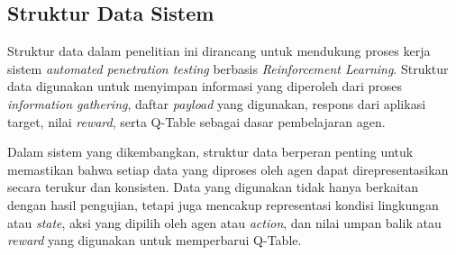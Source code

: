 \subsection{Struktur Data Sistem}

Struktur data dalam penelitian ini dirancang untuk mendukung proses kerja sistem \textit{automated penetration testing} berbasis \textit{Reinforcement Learning}. Struktur data digunakan untuk menyimpan informasi yang diperoleh dari proses \textit{information gathering}, daftar \textit{payload} yang digunakan, respons dari aplikasi target, nilai \textit{reward}, serta Q-Table sebagai dasar pembelajaran agen.

Dalam sistem yang dikembangkan, struktur data berperan penting untuk memastikan bahwa setiap data yang diproses oleh agen dapat direpresentasikan secara terukur dan konsisten. Data yang digunakan tidak hanya berkaitan dengan hasil pengujian, tetapi juga mencakup representasi kondisi lingkungan atau \textit{state}, aksi yang dipilih oleh agen atau \textit{action}, dan nilai umpan balik atau \textit{reward} yang digunakan untuk memperbarui Q-Table.

